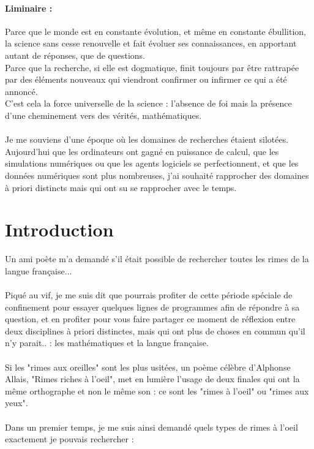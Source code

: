 \documentclass[french]{article}
\begin{document}
\paragraph{Liminaire :\\}
Parce que le monde est en constante évolution, et même en constante ébullition, la science sans cesse renouvelle et fait évoluer ses connaissances, en apportant autant de réponses, que de questions.\\
Parce que la recherche, si elle est dogmatique, finit toujours par être rattrapée par des éléments nouveaux qui viendront confirmer ou infirmer ce qui a été annoncé.\\
C'est cela la force universelle de la science : l'absence de foi mais la présence d'une cheminement vers des vérités, mathématiques.\\
\\
Je me souviens d'une époque où les domaines de recherches étaient silotées.\\
Aujourd'hui que les ordinateurs ont gagné en puissance de calcul, que les simulations numériques ou que les agents logiciels se perfectionnent, et que les données numériques sont plus nombreuses, j'ai souhaité rapprocher des domaines à priori distincts mais qui ont su se rapprocher avec le temps.\\
\newpage
\section{Introduction}
Un ami poète m'a demandé s'il était possible de rechercher toutes les rimes de la langue française...\\
\\
Piqué au vif, je me suis dit que pourrais profiter de cette période spéciale de confinement pour essayer quelques lignes de programmes afin de répondre à sa question, et en profiter pour vous faire partager ce moment de réflexion entre deux disciplines à priori distinctes, mais qui ont plus de choses en commun qu'il n'y parait.. : les mathématiques et la langue française.\\
\\
Si les "rimes aux oreilles" sont les plus usitées, un poème célèbre d'Alphonse Allais, "Rimes riches à l’oeil", met en lumière l'usage de deux finales qui ont la même orthographe et non le même son : ce sont les "rimes à l'oeil" ou "rimes aux yeux".\\
\\
Dans un premier temps, je me suis ainsi demandé quels types de rimes à l'oeil  exactement je pouvais rechercher :\\
\end{document}
